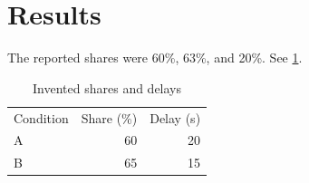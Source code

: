 \section{Results}
The reported shares were 60\%, 63\%, and 20\%.
See \ref{tab:units}.
\begin{table}\caption{Invented shares and delays}\label{tab:units}
\begin{tabular}{lrr}
Condition & Share (\%) & Delay (s) \\
A & 60 & 20 \\[2pt]
B & 65 & 15 \\
\end{tabular}\end{table}
\nocite{*}

